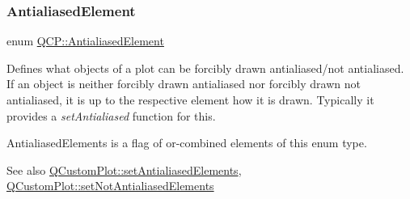\subsubsection{\texorpdfstring{Antialiased\+Element}{AntialiasedElement}}
{\footnotesize\ttfamily enum \hyperlink{namespace_q_c_p_ae55dbe315d41fe80f29ba88100843a0c}{Q\+C\+P\+::\+Antialiased\+Element}}

Defines what objects of a plot can be forcibly drawn antialiased/not antialiased. If an object is neither forcibly drawn antialiased nor forcibly drawn not antialiased, it is up to the respective element how it is drawn. Typically it provides a {\itshape set\+Antialiased} function for this.

{\ttfamily Antialiased\+Elements} is a flag of or-\/combined elements of this enum type.

\begin{DoxySeeAlso}{See also}
\hyperlink{class_q_custom_plot_af6f91e5eab1be85f67c556e98c3745e8}{Q\+Custom\+Plot\+::set\+Antialiased\+Elements}, \hyperlink{class_q_custom_plot_ae10d685b5eabea2999fb8775ca173c24}{Q\+Custom\+Plot\+::set\+Not\+Antialiased\+Elements} 
\end{DoxySeeAlso}
